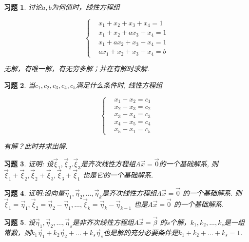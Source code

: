 \documentclass[a4paper]{book}
\newtheorem{ex}{习题}[chapter]
\begin{document}
\begin{ex}\label{5.20}
讨论$a,b$为何值时，线性方程组

\begin{displaymath}\left\{\begin{aligned}&
x_1+x_2+x_3+x_4=1\\&x_1+x_2+ax_3+x_4=1\\&x_1+ax_2+x_3+x_4=1\\&ax_1+x_2+x_3+x_4=b
\end{aligned}\right.\end{displaymath}

无解，有唯一解，有无穷多解；并在有解时求解.
\end{ex}

\begin{ex}\label{5.21}
当$c_1,c_2,c_3,c_4,c_5$满足什么条件时, 线性方程组

\begin{displaymath}\left\{\begin{aligned}&
x_1-x_2=c_1\\&x_2-x_3=c_2\\&x_3-x_4=c_3\\&x_4-x_5=c_4\\&x_5-x_1=c_5
\end{aligned}\right.\end{displaymath}

有解？此时并求出解.
\end{ex}

\begin{ex}\label{5.22}
证明: 设$\vec{\xi}_1,\vec{\xi}_2.\vec{\xi}_3$是齐次线性方程组$A\vec{x}=\vec{0}$的一个基础解系, 则$\vec{\xi}_1+\vec{\xi}_2,\vec{\xi}_2+\vec{\xi}_3,\vec{\xi}_3+\vec{\xi}_1$ 也是它的一个基础解系.
\end{ex}

\begin{ex}\label{5.23}
证明:设向量$\vec{\eta}_1,\vec{\eta}_2,\dots ,\vec{\eta}_k$是齐次线性方程组$A\vec{x}=\vec{0}$ 的一个基础解系. 则 $\vec{\xi}_1=\vec{\eta}_1,\vec{\xi}_2=\vec{\eta}_2-\vec{\eta}_1,\dots,\vec{\xi}_k=\vec{\eta}_k-\vec{\eta}_{k-1}$ 也是$A\vec{x}=\vec{0}$ 的一个基础解系.
\end{ex}

\begin{ex}\label{5.24}
设$\vec{\eta}_1,\vec{\eta}_2,\dots,\vec{\eta}_s$是非齐次线性方程组$A\vec{x}=\vec{\beta}$ 的$s$个解，$k_1,k_2,\dots,k_s$是一组常数，则$k_1 \vec{\eta}_1+k_2 \vec{\eta}_2+\dots+k_s \vec{\eta}_s$也是解的充分必要条件是$k_1+k_2+\dots +k_s=1$.
\end{ex}
\end{document}
